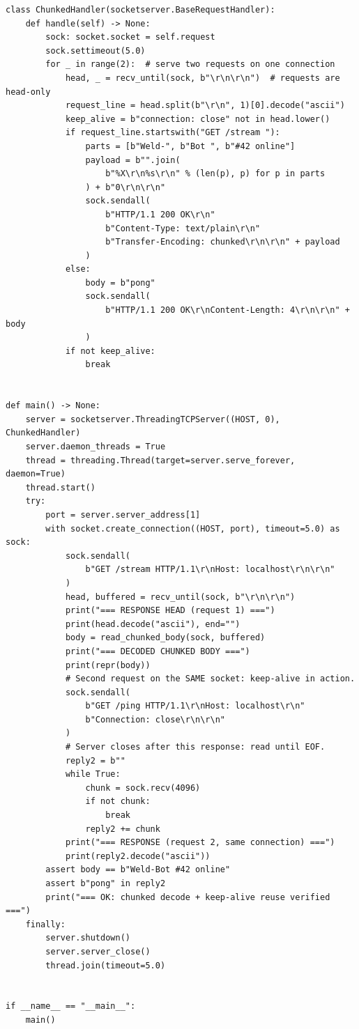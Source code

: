 \begin{verbatim}
class ChunkedHandler(socketserver.BaseRequestHandler):
    def handle(self) -> None:
        sock: socket.socket = self.request
        sock.settimeout(5.0)
        for _ in range(2):  # serve two requests on one connection
            head, _ = recv_until(sock, b"\r\n\r\n")  # requests are head-only
            request_line = head.split(b"\r\n", 1)[0].decode("ascii")
            keep_alive = b"connection: close" not in head.lower()
            if request_line.startswith("GET /stream "):
                parts = [b"Weld-", b"Bot ", b"#42 online"]
                payload = b"".join(
                    b"%X\r\n%s\r\n" % (len(p), p) for p in parts
                ) + b"0\r\n\r\n"
                sock.sendall(
                    b"HTTP/1.1 200 OK\r\n"
                    b"Content-Type: text/plain\r\n"
                    b"Transfer-Encoding: chunked\r\n\r\n" + payload
                )
            else:
                body = b"pong"
                sock.sendall(
                    b"HTTP/1.1 200 OK\r\nContent-Length: 4\r\n\r\n" + body
                )
            if not keep_alive:
                break


def main() -> None:
    server = socketserver.ThreadingTCPServer((HOST, 0), ChunkedHandler)
    server.daemon_threads = True
    thread = threading.Thread(target=server.serve_forever, daemon=True)
    thread.start()
    try:
        port = server.server_address[1]
        with socket.create_connection((HOST, port), timeout=5.0) as sock:
            sock.sendall(
                b"GET /stream HTTP/1.1\r\nHost: localhost\r\n\r\n"
            )
            head, buffered = recv_until(sock, b"\r\n\r\n")
            print("=== RESPONSE HEAD (request 1) ===")
            print(head.decode("ascii"), end="")
            body = read_chunked_body(sock, buffered)
            print("=== DECODED CHUNKED BODY ===")
            print(repr(body))
            # Second request on the SAME socket: keep-alive in action.
            sock.sendall(
                b"GET /ping HTTP/1.1\r\nHost: localhost\r\n"
                b"Connection: close\r\n\r\n"
            )
            # Server closes after this response: read until EOF.
            reply2 = b""
            while True:
                chunk = sock.recv(4096)
                if not chunk:
                    break
                reply2 += chunk
            print("=== RESPONSE (request 2, same connection) ===")
            print(reply2.decode("ascii"))
        assert body == b"Weld-Bot #42 online"
        assert b"pong" in reply2
        print("=== OK: chunked decode + keep-alive reuse verified ===")
    finally:
        server.shutdown()
        server.server_close()
        thread.join(timeout=5.0)


if __name__ == "__main__":
    main()
\end{verbatim}

